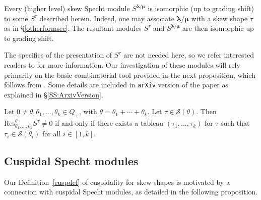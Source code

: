 \documentclass[Unicode,ALCO]{cedram}
\newcommand{\SSSS}{\mathcal{S}}
\newcommand{\0}{{\bar 0}}
\newcommand{\Res}{{\mathrm {Res}}}
\newcommand{\blam}{\boldsymbol{\lambda}}
\newcommand{\bmu}{\boldsymbol{\mu}}
\begin{document}
\begin{rema}\label{highno}
Every (higher level) skew Specht module \(S^{\blam/\bmu}\) is isomorphic (up to grading shift) to some \(S^\tau\) described herein. Indeed, one may associate \(\blam/\bmu\) with a skew shape \(\tau\) as in \S\ref{otherformsec}. The resultant modules \(S^\tau\) and \(S^{\blam/\bmu}\) are then isomorphic up to grading shift.
\end{rema}

The specifics of the presentation of \(S^\tau\) are not needed here, so we refer interested readers to \cite{KMRUnivSpecht, MuSkew} for more information. Our investigation of these modules will rely primarily on the basic combinatorial tool provided in the next proposition, which follows from \cite[Theorem~5.12]{MuSkew}. Some details are included in {\tt arXiv} version of the paper as explained in \S\ref{SS:ArxivVersion}.  






\begin{prop}\label{Spechtres2}
Let \(0 \neq \theta, \theta_1, \ldots, \theta_k \in Q_+\), with \(\theta = \theta_1 + \cdots + \theta_k\). Let \(\tau \in \SSSS(\theta)\). Then \(\Res_{\theta_1, \ldots, \theta_k}^\theta S^\tau \neq 0\) if and only if there exists a tableau \((\tau_1, \ldots, \tau_k)\) for \(\tau\) such that \(\tau_i \in \SSSS(\theta_i)\) for all \(i \in [1,k]\).
\end{prop}







\subsection{Cuspidal Specht modules}
Our Definition~\ref{cuspdef} of cuspidality for skew shapes is motivated by a connection with cuspidal Specht modules, as detailed in the following proposition.
\end{document}
